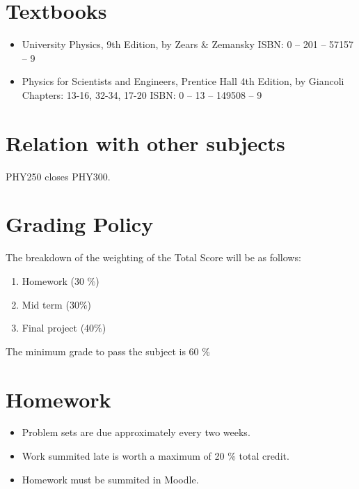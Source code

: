 \documentclass[12pt]{article}
\begin{document}

\section*{Textbooks}

\begin{itemize}
\item University Physics, 9th Edition, by  Zears $\&$ Zemansky
ISBN: 0 – 201 – 57157 – 9 
\item 
Physics for Scientists and Engineers, Prentice Hall 4th Edition, by Giancoli 
		Chapters:  13-16, 32-34, 17-20  
		ISBN: 0 – 13 – 149508 – 9 

\end{itemize}




\section*{Relation with other subjects}

PHY250 closes PHY300. 

\section*{Grading Policy}

The breakdown of the weighting of the Total Score will be as follows:

\begin{enumerate}
\item  	Homework (30 $\%$)
\item   Mid term (30$\%$)
\item 	Final project (40$\%$)

\end{enumerate}

The minimum grade to pass the subject is 60 \% 



\section*{Homework}

\begin{itemize}
	\item Problem sets are due approximately every two weeks. 
	\item  Work summited late is worth a maximum of 20 \% total credit.
	\item Homework must be summited in Moodle.
  \end{itemize}
  
\end{document}
